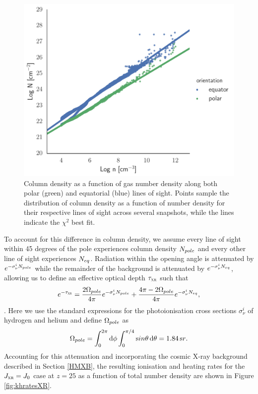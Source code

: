 \documentclass{thesis}
\newcommand{\jxr}{\ensuremath{J_{\textsc{xr}}}\xspace}
\begin{document}
\begin{figure}
\begin{center}
\includegraphics[width=\columnwidth]{figures/optical_depth/col_density_fit}
\caption{\label{fig:ncol_fit}
Column density as a function of gas number density along both polar (green) and equatorial (blue) lines of sight.  Points sample the distribution of column density as a function of number density for their respective lines of sight across several snapshots, while the lines indicate the $\chi^2$ best fit.}
\end{center}
\end{figure}

To account for this difference in column density, we assume every line of sight within 45 degrees of the pole \citep{Hosokawaetal2011} experiences column density $N_{\mathrm \small pole}$ and every other line of sight experiences $N_{\mathrm \small eq}$. Radiation within the opening angle is attenuated by $e^{-\sigma_{\nu}^i N_{\mathrm \small pole}}$ while the remainder of the background is attenuated by $e^{-\sigma_{\nu}^i N_{\mathrm \small eq}}$, allowing us to define an effective optical depth $\tau_{\textsc{xr}}$ such that
\begin{equation}
e^{-\tau_{\textsc{xr}}} = \frac{2 \Omega_{\mathrm \small pole}}{4\pi} e^{-\sigma_{\nu}^i N_{\mathrm \small pole}} + \frac{4\pi - 2 \Omega_{\mathrm \small pole}}{4\pi} e^{-\sigma_{\nu}^i N_{\mathrm \small eq}},
\end{equation}
\citep[e.g.,][]{ClarkGlover2014}.
Here we use the standard expressions for the photoionisation cross sections $\sigma^i_{\nu}$ of hydrogen and helium \citep[e.g.,][]{BarkanaLoeb2001, OsterbrockFerland2006} and define $\Omega_{\mathrm \small pole}$ as
\begin{equation}
\Omega_{\mathrm \small pole} = \int_0^{2\pi}{\mathrm d}\phi \int_0^{\pi/4}{\mathrm sin}\theta \,{\mathrm d}\theta
						 = 1.84\,{\mathrm sr}.
\end{equation}
Accounting for this attenuation and incorporating the cosmic X-ray background described in Section \ref{HMXB}, the resulting ionisation and heating rates for the $\jxr=J_0$ case at $z=25$ as a function of total number density are shown in Figure \ref{fig:khratesXR}.
\end{document}
